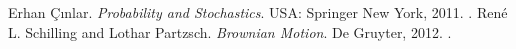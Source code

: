 \newpage
\thispagestyle{empty}
\begin{thebibliography}{9}
		Erhan {\c{C}}{\i}nlar. \emph{Probability and Stochastics}. USA: Springer New York, 2011. .
		René L. Schilling and Lothar Partzsch. \emph{Brownian Motion}. De Gruyter, 2012. .
\end{thebibliography}